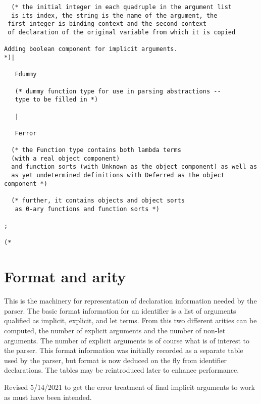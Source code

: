 \documentclass[12pt]{article}
\begin{document}
\begin{verbatim}
  (* the initial integer in each quadruple in the argument list
  is its index, the string is the name of the argument, the 
 first integer is binding context and the second context
 of declaration of the original variable from which it is copied 

Adding boolean component for implicit arguments.
*)|
 
   Fdummy

   (* dummy function type for use in parsing abstractions --
   type to be filled in *)

   |

   Ferror

  (* the Function type contains both lambda terms 
  (with a real object component)
  and function sorts (with Unknown as the object component) as well as
  as yet undetermined definitions with Deferred as the object component *)

  (* further, it contains objects and object sorts
   as 0-ary functions and function sorts *)

;

(*

\end{verbatim}

\newpage

\section{Format and arity}

This is the machinery for representation of declaration information needed by the parser.  The basic format information for
an identifier is a list of arguments qualified as implicit, explicit, and let terms.  From this two different arities can be computed, the
number of explicit arguments and the number of non-let arguments.  The number of explicit arguments is of course what is of interest
to the parser.  This format information was initially recorded as a separate table used by the parser, but format is now deduced on the fly from
identifier declarations.  The tables may be reintroduced later to enhance performance.

Revised 5/14/2021 to get the error treatment of final implicit arguments to work as must have been intended.
\end{document}
